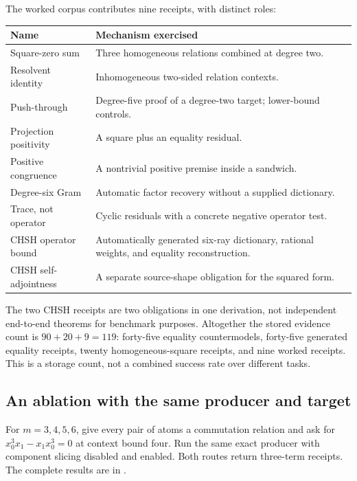 The worked corpus contributes nine receipts, with distinct roles:
\begin{center}\small
\begin{tabularx}{\textwidth}{@{}lX@{}}
\toprule Name & Mechanism exercised\\\midrule
Square-zero sum & Three homogeneous relations combined at degree two.\\
Resolvent identity & Inhomogeneous two-sided relation contexts.\\
Push-through & Degree-five proof of a degree-two target; lower-bound controls.\\
Projection positivity & A square plus an equality residual.\\
Positive congruence & A nontrivial positive premise inside a sandwich.\\
Degree-six Gram & Automatic factor recovery without a supplied dictionary.\\
Trace, not operator & Cyclic residuals with a concrete negative operator test.\\
CHSH operator bound & Automatically generated six-ray dictionary, rational
weights, and equality reconstruction.\\
CHSH self-adjointness & A separate source-shape obligation for the squared form.\\
\bottomrule
\end{tabularx}
\end{center}
The two CHSH receipts are two obligations in one derivation, not independent
end-to-end theorems for benchmark purposes. Altogether the stored evidence
count is $90+20+9=119$: forty-five equality countermodels, forty-five generated
equality receipts, twenty homogeneous-square receipts, and nine worked receipts.
This is a storage count, not a combined success rate over different tasks.

\subsection{An ablation with the same producer and target}

For $m=3,4,5,6$, give every pair of atoms a commutation relation and ask for
$x_0^3x_1-x_1x_0^3=0$ at context bound four. Run the same exact producer with
component slicing disabled and enabled. Both routes return three-term receipts.
The complete results are in .


